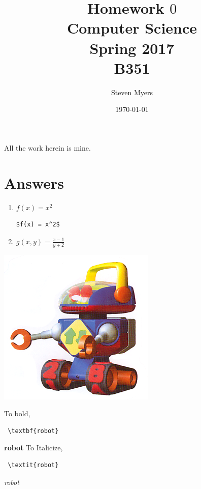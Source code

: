 \documentclass{article}
\begin{document}
\title{Homework $0$\\ Computer Science \\ Spring 2017\\ B351}         %
\author{Steven Myers}        %
\date{\today}          %
\maketitle


\makeatother     %




\pagestyle{plain}
All the work herein is mine.

\section*{Answers}

\begin{enumerate}
\item $f(x) = x^2$ \begin{verbatim}$f(x) = x^2$\end{verbatim}
\item $g(x,y) = \frac{x - 1}{y + 2}$
\end{enumerate}
\includegraphics[scale=0.5]{robot.png}

To bold, \begin{verbatim} \textbf{robot} \end{verbatim} \textbf{robot}
To Italicize, \begin{verbatim} \textit{robot} \end{verbatim} \textit{robot}
\end{document}
